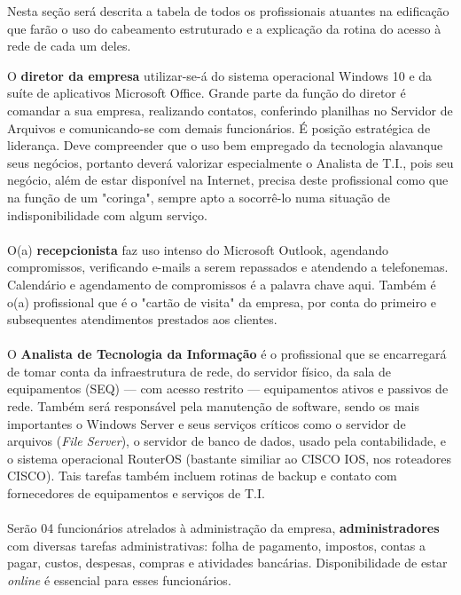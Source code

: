 \documentclass[	DIV=calc,%
							paper=a4,%
							fontsize=12pt,%
							onecolumn]{scrartcl}	 					%
\begin{document}
Nesta seção será descrita a tabela de todos os profissionais atuantes na edificação que farão o uso do cabeamento estruturado e a explicação da rotina do acesso à rede de cada um deles.





O \textbf{diretor da empresa} utilizar-se-á do sistema operacional Windows 10 e da suíte de aplicativos Microsoft Office. Grande parte da função do diretor é comandar a sua empresa, realizando contatos, conferindo planilhas no Servidor de Arquivos e comunicando-se com demais funcionários. É posição estratégica de liderança. Deve compreender que o uso bem empregado da tecnologia alavanque seus negócios, portanto deverá valorizar especialmente o Analista de T.I., pois seu negócio, além de estar disponível na Internet, precisa deste profissional como que na função de um "coringa", sempre apto a socorrê-lo numa situação de indisponibilidade com algum serviço.
\\ \\
O(a) \textbf{recepcionista} faz uso intenso do Microsoft Outlook, agendando compromissos, verificando e-mails a serem repassados e atendendo a telefonemas. Calendário e agendamento de compromissos é a palavra chave aqui. Também é o(a) profissional que é o "cartão de visita" da empresa, por conta do primeiro e subsequentes atendimentos prestados aos clientes.
\\ \\
O \textbf{Analista de Tecnologia da Informação} é o profissional que se encarregará de tomar conta da infraestrutura de rede, do servidor físico, da sala de equipamentos (SEQ) --- com acesso restrito --- equipamentos ativos e passivos de rede. Também será responsável pela manutenção de software, sendo os mais importantes o Windows Server e seus serviços críticos como o servidor de arquivos (\textit{File Server}), o servidor de banco de dados, usado pela contabilidade, e o sistema operacional RouterOS (bastante similiar ao CISCO IOS, nos roteadores CISCO). Tais tarefas também incluem rotinas de backup e contato com fornecedores de equipamentos e serviços de T.I.
\\ \\
Serão 04 funcionários atrelados à administração da empresa, \textbf{administradores} com diversas tarefas administrativas: folha de pagamento, impostos, contas a pagar, custos, despesas, compras e atividades bancárias. Disponibilidade de estar \textit{online} é essencial para esses funcionários.
\end{document}
